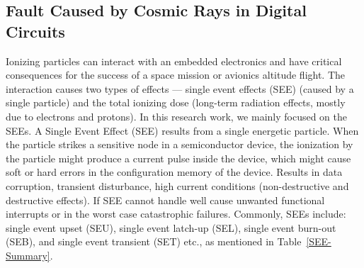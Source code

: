 \subsection{Fault Caused by Cosmic Rays in Digital Circuits}
Ionizing particles can interact with an embedded electronics and have critical consequences for the success of a space mission or avionics altitude flight. The interaction causes two types of effects ---
single event effects (SEE) (caused by a single particle) and the total ionizing dose (long-term radiation effects, mostly due to electrons and protons). In this research work, we mainly focused on the SEEs.
A Single Event Effect (SEE) results from a single energetic particle. When the particle strikes a sensitive node in a semiconductor device, the ionization by the particle might produce a current pulse inside the device, which might cause soft or hard errors in the configuration memory of the device. Results in data corruption, transient disturbance, high current conditions (non-destructive and destructive
effects). If SEE cannot handle well cause unwanted functional interrupts or in the worst case catastrophic failures. Commonly, SEEs include: single event upset (SEU), single event latch-up (SEL), single event burn-out (SEB), and single event transient (SET) etc., as mentioned in Table~\ref{SEE-Summary}. 
